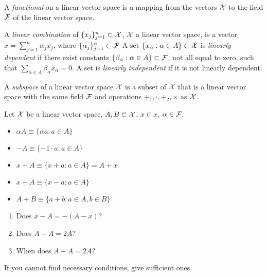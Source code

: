 \begin{Definition}
        A {\em functional\/} on a linear vector space is a mapping from the vectors ${\cal X}$
        to the field ${\cal F}$ of the linear vector space.
\end{Definition}

\begin{Definition}
        A {\em linear combination\/} of $\{ x_j\}_{j=1}^n \subset {\cal X}$, ${\cal X}$ a linear
        vector space, is a vector $x = \sum_{j=1}^n \alpha_j x_j$, where
        $\{ \alpha_j\}_{j=1}^n \subset {\cal F}$
        A set $\{x_\alpha : \alpha \in A \} \subset {\cal X}$ is {\em linearly dependent\/}
        if there exist constants $\{ \beta_\alpha : \alpha \in A \} \subset {\cal F}$, not all
        equal to zero, such that $\sum_{\alpha \in A} \beta_\alpha x_\alpha = 0$.
        A set is {\em linearly independent\/} if it is not linearly dependent.
\end{Definition}

\begin{Definition}
        A {\em subspace\/} of a linear vector space ${\cal X}$ is a subset of ${\cal X}$ that is
        a linear vector space with the same field ${\cal F}$ and operations $+_1, \cdot, +_2, \times$
        as ${\cal X}$.
\end{Definition}


\begin{Definition}
        Let ${\cal X}$ be a linear vector space, $A, B \subset {\cal X}$, $x \in x$, $\alpha \in {\cal F}$.
        \begin{itemize}
                \item $\alpha A \equiv \{ \alpha a : a \in A\}$
                \item $-A \equiv \{ -1 \cdot a : a \in A \}$
                \item $x + A \equiv \{x+a : a \in A \} = A + x$
                \item $x - A \equiv \{ x - a: a \in A \}$
                \item $A + B \equiv \{ a + b: a \in A, b \in B \}$
        \end{itemize}
\end{Definition}

\begin{Exercise}
        \begin{enumerate}
                \item Does $x - A = -(A - x)$?
                \item Does $A + A = 2A$?
                \item When does $A - A = 2A$?
        \end{enumerate}
        If you cannot find necessary conditions, give sufficient ones.
\end{Exercise}

